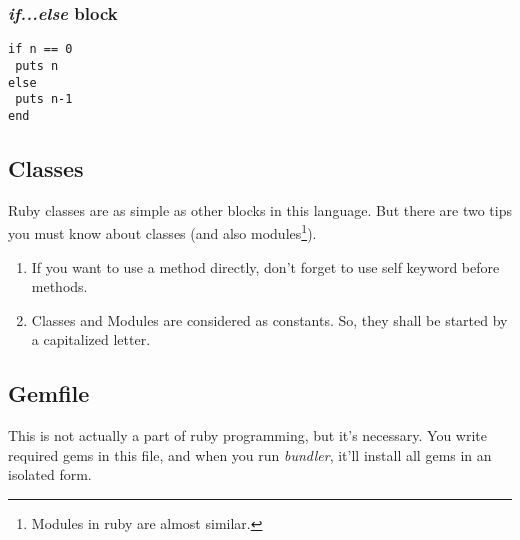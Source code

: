 \documentclass[11pt]{article}
\begin{document}
\subsubsection{\textit{if...else} block}

\begin{verbatim}
if n == 0
 puts n
else
 puts n-1
end
\end{verbatim}

\subsection{Classes}
Ruby classes are as simple as other blocks in this language. But there are two tips you must know about classes (and also modules\footnote{Modules in ruby are almost similar. }). 
\begin{enumerate}
\item If you want to use a method directly, don't forget to use self keyword before methods.
\item Classes and Modules are considered as constants. So, they shall be started by a capitalized letter.
\end{enumerate}

\subsection{Gemfile}
This is not actually a part of ruby programming, but it's necessary. You write required gems in this file, and when you run \textit{bundler}, it'll install all gems in an isolated form. 
\end{document}
